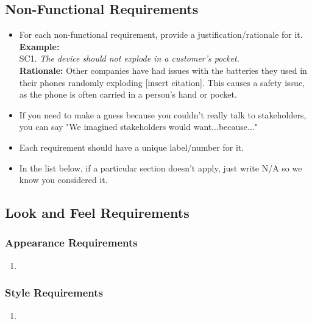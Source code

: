 \documentclass[]{article}
\begin{document}
\begin{enumerate}[{\bf BE1.}]
\begin{enumerate}[{\bf BE3.}]
\begin{enumerate}[{\bf VP1.}]

\section{Non-Functional Requirements}
\label{sec:non-functional_requirements}


\begin{itemize}
	\item For each non-functional requirement, provide a justification/rationale for it.\\
	{\bf Example:} \\
	SC1. \emph{The device should not explode in a customer’s pocket.}\\
	{\bf Rationale:} Other companies have had issues with the batteries they used in their phones randomly exploding [insert citation]. This causes a safety issue, as the phone is often carried in a person's hand or pocket.	
	\item If you need to make a guess because you couldn't really talk to stakeholders, you can say "We imagined stakeholders would want...because..."
	\item Each requirement should have a unique label/number for it.
	\item In the list below, if a particular section doesn't apply, just write N/A so we know you considered it.
\end{itemize}

\subsection{Look and Feel Requirements}
\label{sub:look_and_feel_requirements}

\subsubsection{Appearance Requirements}
\label{ssub:appearance_requirements}
\begin{enumerate}[{LF-A}1. ]
	\item 
\end{enumerate}

\subsubsection{Style Requirements}
\label{ssub:style_requirements}
\begin{enumerate}[{LF-S}1. ]
	\item 
\end{enumerate}


\end{enumerate}
\end{enumerate}
\end{enumerate}
\end{document}
